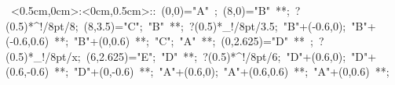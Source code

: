 %

\hbox{
\xy    <0.5cm,0cm>:<0cm,0.5cm>::
       (0,0)="A" ; (8,0)="B" **\dir{-}; ?(0.5)*^!/8pt/{8};
       (8,3.5)="C"; "B" **\dir{-}; ?(0.5)*_!/8pt/{3.5};
       "B"+(-0.6,0); "B"+(-0.6,0.6) **\dir{-}; 
       "B"+(0,0.6) **\dir{-};  "C"; "A" **\dir{-};  
       (0,2.625)="D" **\dir{-} ;  ?(0.5)*_!/8pt/{x};
       (6,2.625)="E"; "D" **\dir{-};  ?(0.5)*^!/8pt/{6};
       "D"+(0.6,0);  "D"+(0.6,-0.6) **\dir{-};  
       "D"+(0,-0.6) **\dir{-};  
       "A"+(0.6,0);  "A"+(0.6,0.6) **\dir{-};  
       "A"+(0,0.6) **\dir{-};  
\endxy}
	   
